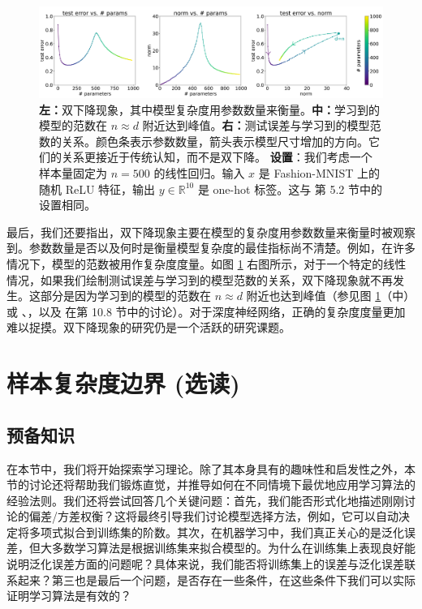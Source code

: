 \begin{figure}[H]
    \centering
    \includegraphics[width=1.0\linewidth]{figs/double_descent_norm.png}
    \caption{\textbf{左：}双下降现象，其中模型复杂度用参数数量来衡量。\textbf{中：}学习到的模型的范数在 $n \approx d$ 附近达到峰值。\textbf{右：}测试误差与学习到的模型范数的关系。颜色条表示参数数量，箭头表示模型尺寸增加的方向。它们的关系更接近于传统认知，而不是双下降。 \textbf{设置}：我们考虑一个样本量固定为 $n = 500$ 的线性回归。输入 $x$ 是 Fashion-MNIST 上的随机 ReLU 特征，输出 $y \in \mathbb{R}^{10}$ 是 one-hot 标签。这与 \cite{nakkiran2020optimal} 第 5.2 节中的设置相同。}
    \label{fig:8.12}
\end{figure}

最后，我们还要指出，双下降现象主要在模型的复杂度用参数数量来衡量时被观察到。参数数量是否以及何时是衡量模型复杂度的最佳指标尚不清楚。例如，在许多情况下，模型的范数被用作复杂度度量。如图 \ref{fig:8.12} 右图所示，对于一个特定的线性情况，如果我们绘制测试误差与学习到的模型范数的关系，双下降现象就不再发生。这部分是因为学习到的模型的范数在 $n \approx d$ 附近也达到峰值（参见图 \ref{fig:8.12}（中）或 \cite{belkin2019reconciling}、\cite{mei2022generalization}，以及 \cite{james2021introduction} 在第 10.8 节中的讨论）。对于深度神经网络，正确的复杂度度量更加难以捉摸。双下降现象的研究仍是一个活跃的研究课题。

\section{样本复杂度边界 (选读)}\label{sec:8.3}
\subsection{预备知识}

在本节中，我们将开始探索学习理论。除了其本身具有的趣味性和启发性之外，本节的讨论还将帮助我们锻炼直觉，并推导如何在不同情境下最优地应用学习算法的经验法则。我们还将尝试回答几个关键问题：首先，我们能否形式化地描述刚刚讨论的偏差/方差权衡？这将最终引导我们讨论模型选择方法，例如，它可以自动决定将多项式拟合到训练集的阶数。其次，在机器学习中，我们真正关心的是泛化误差，但大多数学习算法是根据训练集来拟合模型的。为什么在训练集上表现良好能说明泛化误差方面的问题呢？具体来说，我们能否将训练集上的误差与泛化误差联系起来？第三也是最后一个问题，是否存在一些条件，在这些条件下我们可以实际证明学习算法是有效的？

